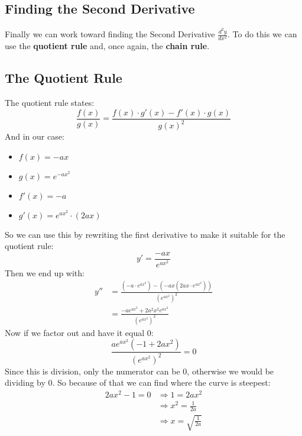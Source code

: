 \documentclass[a4paper,12pt]{article}
\begin{document}
\subsection{Finding the Second Derivative}
Finally we can work toward finding the Second Derivative $\frac{d^2y}{dx^2}$. 
To do this we can use the \textbf{quotient rule} and, once again, 
the \textbf{chain rule}.
%
\subsection*{The Quotient Rule}
The quotient rule states:
\begin{displaymath}
    \frac{f\left(x\right)}{g\left(x\right)} = %
    \frac{f\left(x\right) \cdot g'\left(x\right) - f'\left(x\right) 
    \cdot g\left(x\right)}{g\left(x\right)^2}
\end{displaymath}
And in our case:
\begin{itemize}
    \item $f\left(x\right) = -ax$ %
    \item $g\left(x\right) = e^{-ax^2}$
    \item $f'\left(x\right) = -a$
    \item $g'\left(x\right) = e^{ax^2} \cdot \left(2ax\right)$
\end{itemize}
So we can use this by rewriting the first derivative to make it suitable for 
the quotient rule:
\begin{displaymath}
    y' = \frac{-ax}{e^{ax^2}}
\end{displaymath}
Then we end up with:
\begin{equation}
    \begin{split} %
        y'' &= \frac{\left(-a \cdot e^{ax^2}\right) - 
        \left(-ax\left(2ax \cdot e^{ax^2}\right)\right)}
        {\left(e^{ax^2}\right)^2} \\ %
            &= \frac{-ae^{ax^2} + 2a^2x^2e^{ax^2}} %
            {\left(e^{ax^2}\right)^2}
    \end{split}
\end{equation}
Now if we factor out and have it equal $0$:
\begin{equation}
    \frac{ae^{ax^2}\left(-1+2ax^2\right)}
    {\left(e^{ax^2}\right)^2} = 0 %
\end{equation}
Since this is division, only the numerator can be $0$, 
otherwise we would be dividing by $0$. 
So because of that we can find where the curve is steepest:
\begin{displaymath}
    \begin{split} %
        2ax^2-1 = 0 &\Rightarrow 1 = 2ax^2 \\ %
                    &\Rightarrow x^2 = \frac{1}{2a} \\ %
                    &\Rightarrow x = \sqrt{\frac{1}{2a}}
    \end{split}
\end{displaymath}
%
\end{document}
